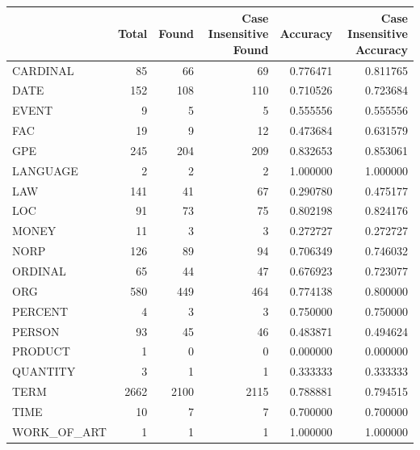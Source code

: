 \begin{tabular}{lrrrrr}
\toprule
 & Total & Found & Case Insensitive Found & Accuracy & Case Insensitive Accuracy \\
\midrule
CARDINAL & 85 & 66 & 69 & 0.776471 & 0.811765 \\
DATE & 152 & 108 & 110 & 0.710526 & 0.723684 \\
EVENT & 9 & 5 & 5 & 0.555556 & 0.555556 \\
FAC & 19 & 9 & 12 & 0.473684 & 0.631579 \\
GPE & 245 & 204 & 209 & 0.832653 & 0.853061 \\
LANGUAGE & 2 & 2 & 2 & 1.000000 & 1.000000 \\
LAW & 141 & 41 & 67 & 0.290780 & 0.475177 \\
LOC & 91 & 73 & 75 & 0.802198 & 0.824176 \\
MONEY & 11 & 3 & 3 & 0.272727 & 0.272727 \\
NORP & 126 & 89 & 94 & 0.706349 & 0.746032 \\
ORDINAL & 65 & 44 & 47 & 0.676923 & 0.723077 \\
ORG & 580 & 449 & 464 & 0.774138 & 0.800000 \\
PERCENT & 4 & 3 & 3 & 0.750000 & 0.750000 \\
PERSON & 93 & 45 & 46 & 0.483871 & 0.494624 \\
PRODUCT & 1 & 0 & 0 & 0.000000 & 0.000000 \\
QUANTITY & 3 & 1 & 1 & 0.333333 & 0.333333 \\
TERM & 2662 & 2100 & 2115 & 0.788881 & 0.794515 \\
TIME & 10 & 7 & 7 & 0.700000 & 0.700000 \\
WORK_OF_ART & 1 & 1 & 1 & 1.000000 & 1.000000 \\
\bottomrule
\end{tabular}
